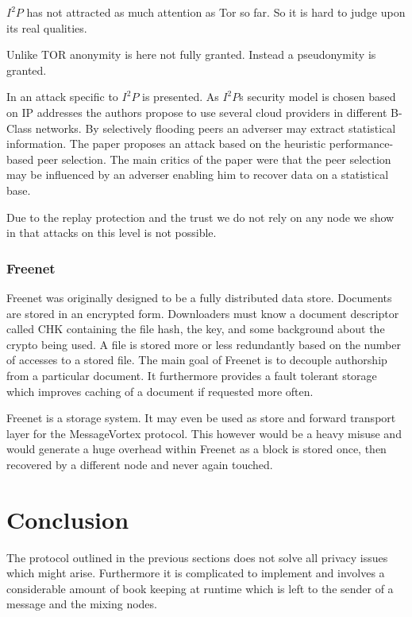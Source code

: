 \documentclass[9pt,journal,compsoc]{IEEEtran}
\begin{document}
$I^2P$ has not attracted as much attention as Tor so far. So it is hard to judge upon its real qualities. 

Unlike TOR anonymity is here not fully granted. Instead a pseudonymity is granted. 

In \cite{pets2011-i2p} an attack specific to $I^2P$ is presented. As $I^2P$s security model is chosen based on IP addresses the authors propose to use several cloud providers in different B-Class networks. By selectively flooding peers an adverser may extract statistical information. The paper proposes an attack based on the heuristic performance-based peer selection. The main critics of the paper were that the peer selection may be influenced by an adverser enabling him to recover data on a statistical base.

Due to the replay protection and the trust we do not rely on any node we show in \cite{messageVortex} that attacks on this level is not possible.

\subsubsection{Freenet}
Freenet was originally designed to be a fully distributed data store\cite{freenet}. Documents are stored in an encrypted form. Downloaders must know a document descriptor called CHK containing the file hash, the key, and some background about the crypto being used. A file is stored more or less redundantly based on the number of accesses to a stored file. The main goal of Freenet is to decouple  authorship from a particular document. It furthermore provides a fault tolerant storage which improves caching of a document if requested more often.

Freenet is a storage system. It may even be used as store and forward transport layer for the MessageVortex protocol. This however would be a heavy misuse and would generate a huge overhead  within Freenet as a block is stored once, then recovered by a different node and never again touched. 

\section{Conclusion}
The protocol outlined in the previous sections does not solve all privacy issues which might arise. Furthermore it is complicated to implement and involves a considerable amount of book keeping at runtime which is left to the sender of a message and the mixing nodes. 
\end{document}
